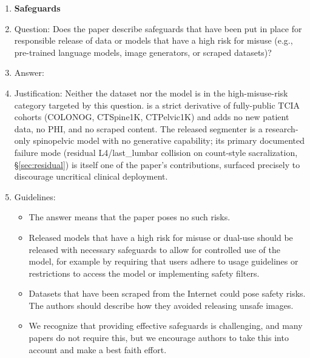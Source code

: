 \begin{enumerate}
\begin{itemize}
        \item The authors should consider possible harms that could arise when the technology is being used as intended and functioning correctly, harms that could arise when the technology is being used as intended but gives incorrect results, and harms following from (intentional or unintentional) misuse of the technology.
        \item If there are negative societal impacts, the authors could also discuss possible mitigation strategies (e.g., gated release of models, providing defenses in addition to attacks, mechanisms for monitoring misuse, mechanisms to monitor how a system learns from feedback over time, improving the efficiency and accessibility of ML).
    \end{itemize}

\item {\bf Safeguards}
    \item[] Question: Does the paper describe safeguards that have been put in place for responsible release of data or models that have a high risk for misuse (e.g., pre-trained language models, image generators, or scraped datasets)?
    \item[] Answer: \answerNA{}
    \item[] Justification: Neither the dataset nor the model is in the high-misuse-risk category targeted by this question. \dataset{} is a strict derivative of fully-public TCIA cohorts (COLONOG, CTSpine1K, CTPelvic1K) and adds no new patient data, no PHI, and no scraped content. The released segmenter is a research-only spinopelvic model with no generative capability; its primary documented failure mode (residual L4/last\_lumbar collision on count-style sacralization, \S\ref{sec:residual}) is itself one of the paper's contributions, surfaced precisely to discourage uncritical clinical deployment.
    \item[] Guidelines:
    \begin{itemize}
        \item The answer \answerNA{} means that the paper poses no such risks.
        \item Released models that have a high risk for misuse or dual-use should be released with necessary safeguards to allow for controlled use of the model, for example by requiring that users adhere to usage guidelines or restrictions to access the model or implementing safety filters.
        \item Datasets that have been scraped from the Internet could pose safety risks. The authors should describe how they avoided releasing unsafe images.
        \item We recognize that providing effective safeguards is challenging, and many papers do not require this, but we encourage authors to take this into account and make a best faith effort.
    \end{itemize}


\end{enumerate}
